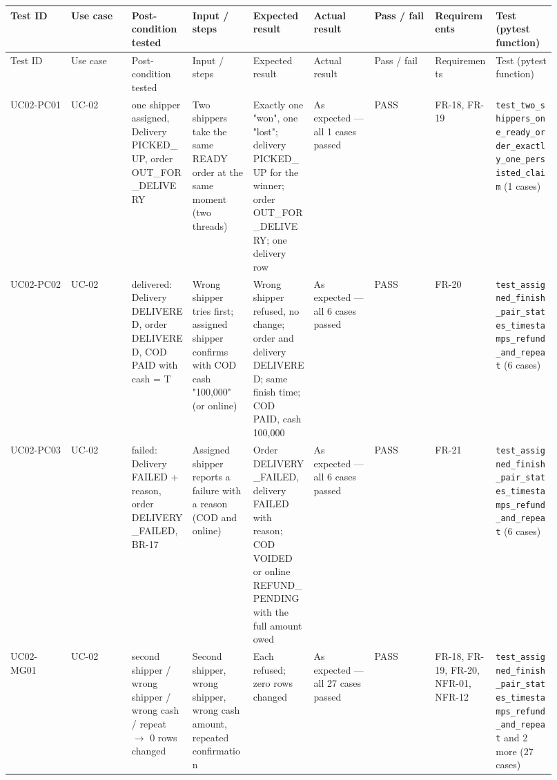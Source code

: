 \begin{landscape}
\begingroup\footnotesize
\begin{longtable}{>{\raggedright\arraybackslash}p{0.1022\linewidth}>{\raggedright\arraybackslash}p{0.1022\linewidth}>{\raggedright\arraybackslash}p{0.1022\linewidth}>{\raggedright\arraybackslash}p{0.1022\linewidth}>{\raggedright\arraybackslash}p{0.1022\linewidth}>{\raggedright\arraybackslash}p{0.1022\linewidth}>{\raggedright\arraybackslash}p{0.1022\linewidth}>{\raggedright\arraybackslash}p{0.1022\linewidth}>{\raggedright\arraybackslash}p{0.1022\linewidth}}
Test ID & Use case & Post-condition tested & Input / steps & Expected result & Actual result & Pass / fail & Requirements & Test (pytest function) \\
\hline\endfirsthead
Test ID & Use case & Post-condition tested & Input / steps & Expected result & Actual result & Pass / fail & Requirements & Test (pytest function) \\
\hline\endhead
UC02-PC01 & UC-02 & one shipper assigned, Delivery PICKED\_UP, order OUT\_FOR\_DELIVERY & Two shippers take the same READY order at the same moment (two threads) & Exactly one "won", one "lost"; delivery PICKED\_UP for the winner; order OUT\_FOR\_DELIVERY; one delivery row & As expected --- all 1 cases passed & PASS & FR-18, FR-19 & \texttt{test\_\allowbreak{}two\_\allowbreak{}shippers\_\allowbreak{}one\_\allowbreak{}ready\_\allowbreak{}order\_\allowbreak{}exactly\_\allowbreak{}one\_\allowbreak{}persisted\_\allowbreak{}claim} (1 cases) \\
UC02-PC02 & UC-02 & delivered: Delivery DELIVERED, order DELIVERED, COD PAID with cash = T & Wrong shipper tries first; assigned shipper confirms with COD cash "100,000" (or online) & Wrong shipper refused, no change; order and delivery DELIVERED; same finish time; COD PAID, cash 100,000 & As expected --- all 6 cases passed & PASS & FR-20 & \texttt{test\_\allowbreak{}assigned\_\allowbreak{}finish\_\allowbreak{}pair\_\allowbreak{}states\_\allowbreak{}timestamps\_\allowbreak{}refund\_\allowbreak{}and\_\allowbreak{}repeat} (6 cases) \\
UC02-PC03 & UC-02 & failed: Delivery FAILED + reason, order DELIVERY\_FAILED, BR-17 & Assigned shipper reports a failure with a reason (COD and online) & Order DELIVERY\_FAILED, delivery FAILED with reason; COD VOIDED or online REFUND\_PENDING with the full amount owed & As expected --- all 6 cases passed & PASS & FR-21 & \texttt{test\_\allowbreak{}assigned\_\allowbreak{}finish\_\allowbreak{}pair\_\allowbreak{}states\_\allowbreak{}timestamps\_\allowbreak{}refund\_\allowbreak{}and\_\allowbreak{}repeat} (6 cases) \\
UC02-MG01 & UC-02 & second shipper / wrong shipper / wrong cash / repeat \ensuremath{\rightarrow} 0 rows changed & Second shipper, wrong shipper, wrong cash amount, repeated confirmation & Each refused; zero rows changed & As expected --- all 27 cases passed & PASS & FR-18, FR-19, FR-20, NFR-01, NFR-12 & \texttt{test\_\allowbreak{}assigned\_\allowbreak{}finish\_\allowbreak{}pair\_\allowbreak{}states\_\allowbreak{}timestamps\_\allowbreak{}refund\_\allowbreak{}and\_\allowbreak{}repeat} and 2 more (27 cases) \\
\end{longtable}
\endgroup
\end{landscape}
